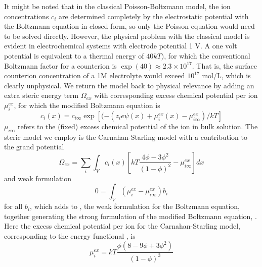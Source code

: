 It might be noted that in the classical Poisson-Boltzmann model, the
ion concentrations $c_i$ are determined completely by the
electrostatic potential with the Boltzmann equation in closed form, so
only the Poisson equation would need to be solved directly. However, the
physical problem with the classical model is evident in electrochemical
systems with electrode potential 1 V. A one volt potential is
equivalent to a thermal energy of $40 kT)$, for which the conventional
Boltzmann factor for a counterion is
$\exp(40)\approx 2.3 \times 10^{17}$.  That is, the surface counterion
concentration of a 1M electrolyte would exceed $10^{17}$ mol/L, which
is clearly unphysical.  We return the model back to physical
relevance by adding an extra steric energy term $\Omega_{ex}$ with
corresponding excess chemical potential per ion $\mu_{i}^{ex}$, for
which the modified Boltzmann equation is
\begin{equation}
    c_i(x)=c_{i\infty}\exp\left[(-(z_i e \psi(x) + \mu_i^{ex}(x)-\mu_{i\infty}^{ex})/kT\right]
    \label{general_Boltzmann}
\end{equation}
$\mu_{i\infty}$ refers to the (fixed) excess chemical potential of the ion in bulk solution.
The steric model we employ is the Carnahan-Starling model
\cite{CarnahanStarling1969} with a contribution to the grand potential
\begin{equation}
    \Omega_{ex} = \sum_{i} \int_{V} c_{i}(x) \left[ kT
    \frac{4\phi - 3\phi^2}{(1-\phi)^2}
    -  \mu_{i\infty}^{ex}
  \right]dx
  \label{CS_energy_functional}
\end{equation}
and weak formulation
\begin{equation}
    0 = \int_{V} (\mu_i^{ex}-\mu_{i\infty}^{ex}) b_i
    \label{weak_CS}
\end{equation}
for all $b_i$, which adds to , the weak
formulation for the Boltzmann equation, together generating the strong
formulation of the modified Boltzmann
equation,  .  Here the excess chemical potential
per ion for the Carnahan-Starling model, corresponding to the energy
functional , is
\begin{equation}
    \mu_{i}^{ex} = kT \frac{\phi(8-9\phi+3\phi^2)}{(1-\phi)^3}
    \label{chem_pot_CS}
\end{equation}

